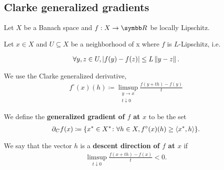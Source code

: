 \subsection{Clarke generalized gradients}\label{sec:clarke_gradients}

Let \( X \) be a Banach space and \( f: X \to \BB{R} \) be locally Lipschitz.

\begin{definition}\label{def:clarke_gradient}\cite[definition 10.3]{Clarke2013}
  Let \( x \in X \) and \( U \subseteq X \) be a neighborhood of x where \( f \) is \( L \)-Lipschitz, i.e.

  \begin{align*}
    \forall y, z \in U, \left\vert f(y) - f(z) \right\vert \leq L \left\Vert y - z \right\Vert.
  \end{align*}

  We use the Clarke generalized derivative,
  \begin{align*}
    f^\circ(x)(h) \coloneqq \limsup_{\substack{y \to x \\ t \downarrow 0}} \frac {f(y + th) - f(y)} t
  \end{align*}

  We define the \textbf{generalized gradient of \( f \) at \( x \)} to be the set
  \begin{align*}
    \partial_C f(x) \coloneqq \{ x^* \in X^* \colon \forall h \in X, f^\circ(x)(h) \geq \left\langle x^*, h \right\rangle \}.
  \end{align*}

  We say that the vector \( h \) is a \textbf{descent direction of \( f \) at \( x \)} if
  \begin{align*}
    \limsup_{t \downarrow 0} \frac {f(x + th) - f(x)} t < 0.
  \end{align*}
\end{definition}

